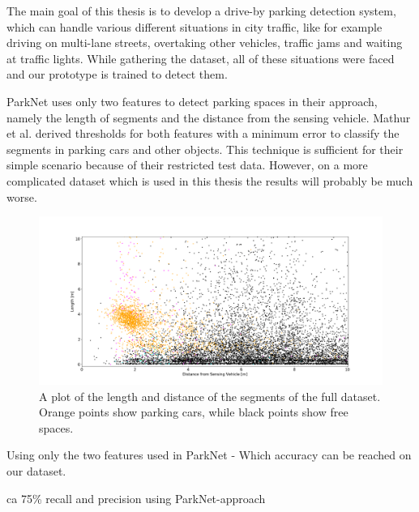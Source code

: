The main goal of this thesis is to develop a drive-by parking detection system, which can handle various different situations in city traffic, like for example driving on multi-lane streets, overtaking other vehicles, traffic jams and waiting at traffic lights. While gathering the dataset, all of these situations were faced and our prototype is trained to detect them.

ParkNet uses only two features to detect parking spaces in their approach, namely the length of segments and the distance from the sensing vehicle. Mathur et al. derived thresholds for both features with a minimum error to classify the segments in parking cars and other objects. This technique is sufficient for their simple scenario because of their restricted test data. However, on a more complicated dataset which is used in this thesis the results will probably be much worse.


\begin{figure}
	\centering
	\includegraphics[width=\textwidth]{img/2d_length_distance_scatter_full_dataset.png}
	\caption{A plot of the length and distance of the segments of the full dataset. Orange points show parking cars, while black points show free spaces.}
	\label{fig:densely_dl_network}
\end{figure}

Using only the two features used in ParkNet - Which accuracy can be reached on our dataset.

ca 75\% recall and precision using ParkNet-approach